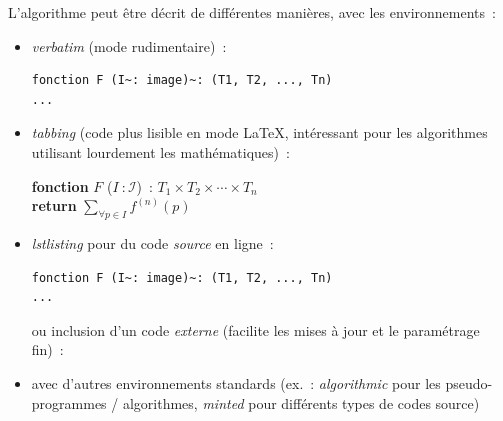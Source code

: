 \documentclass[11pt, french, screen, research-development]{report-rd-info}
\begin{document}
\begin{algorithm*}
   L'algorithme peut être décrit de différentes manières, avec les environnements~:
   \begin{itemize}
      \item \textsl{verbatim} (mode rudimentaire)~:
         \begin{verbatim}
fonction F (I~: image)~: (T1, T2, ..., Tn)
...\end{verbatim}
      \item \textsl{tabbing} (code plus lisible en mode \LaTeX, intéressant pour les algorithmes utilisant lourdement les mathématiques)~:
         \begin{tabbing}
            \textbf{fonction} $F$ ($I~: \mathcal{I}$)~: $T_1 \times T_2 \times \cdots \times T_n$\\
            \textbf{return} $\sum\limits_{\forall p \in I} f^{(n)}(p)$
         \end{tabbing}

      \item \textsl{lstlisting} pour du code \emph{source} en ligne~:
         \begin{lstlisting}
fonction F (I~: image)~: (T1, T2, ..., Tn)
...
         \end{lstlisting}
         ou inclusion d'un code \emph{externe} (facilite les mises à jour et le paramétrage fin)~:
         
      \item avec d'autres environnements standards (ex.~: \textsl{algorithmic} pour les pseudo-programmes / algorithmes, \textsl{minted} pour différents types de codes source)
   \end{itemize}
   \caption{Proposition}
   \label{alg:Proposition}
\end{algorithm*}
\end{document}
